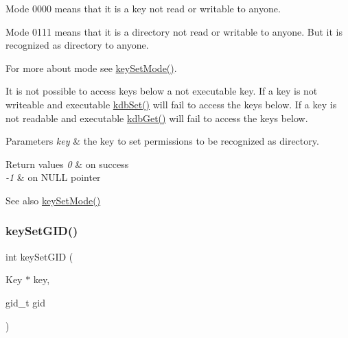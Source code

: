\begin{DoxyItemize}
\item Mode 0000 means that it is a key not read or writable to anyone.
\item Mode 0111 means that it is a directory not read or writable to anyone. But it is recognized as directory to anyone.
\end{DoxyItemize}

For more about mode see \hyperlink{group__meta_ga8803037e35b9da1ce492323a88ff6bc3}{key\+Set\+Mode()}.

It is not possible to access keys below a not executable key. If a key is not writeable and executable \hyperlink{group__kdb_ga11436b058408f83d303ca5e996832bcf}{kdb\+Set()} will fail to access the keys below. If a key is not readable and executable \hyperlink{group__kdb_ga28e385fd9cb7ccfe0b2f1ed2f62453a1}{kdb\+Get()} will fail to access the keys below.


\begin{DoxyParams}{Parameters}
{\em key} & the key to set permissions to be recognized as directory. \\
\hline
\end{DoxyParams}

\begin{DoxyRetVals}{Return values}
{\em 0} & on success \\
\hline
{\em -\/1} & on N\+U\+LL pointer \\
\hline
\end{DoxyRetVals}
\begin{DoxySeeAlso}{See also}
\hyperlink{group__meta_ga8803037e35b9da1ce492323a88ff6bc3}{key\+Set\+Mode()} 
\end{DoxySeeAlso}
\mbox{\label{group__meta_ga9e3d0fb3f7ba906e067727b9155d22e3}} 
\subsubsection{\texorpdfstring{key\+Set\+G\+I\+D()}{keySetGID()}}
{\footnotesize\ttfamily int key\+Set\+G\+ID (\begin{DoxyParamCaption}\item[{Key $\ast$}]{key,  }\item[{gid\+\_\+t}]{gid }\end{DoxyParamCaption})}



